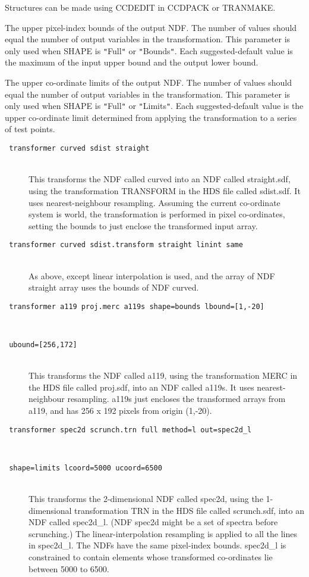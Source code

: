\documentclass[twoside,11pt]{article}
\newcommand{\htmlref}[2]{#1}
\newcommand{\sstexamples}[1]{
   \goodbreak
   \item[Examples:] \mbox{} \\
   \vspace{-3.5ex}
   \begin{description}
      #1
   \end{description}
}
\newcommand{\sstsubsection}[1]{ \item[{#1}] \mbox{} \\}
\newcommand{\sstexamplesubsection}[2]{\sloppy \item{\ssttt #1} \mbox{} \\ #2 }
\newcommand{\sstnotes}[1]{\pagebreak[3] \item[Notes:] \mbox{} \\[1.3ex] #1}
\newenvironment{sstitemize}{%
  \vspace{-4.3ex}\begin{itemize}}{\end{itemize}}
\newcommand{\sstitemlist}[1]{
  \mbox{} \\
  \vspace{-3.5ex}
  \begin{sstitemize}
     #1
  \end{sstitemize}
}
\newcommand{\ssttt}{\tt}
\renewcommand{\sstexamples}[1]{
      \htmlref{\item[Examples:]}{ap:example}
      \begin{description}
         #1
      \end{description}
   }
\renewcommand{\sstsubsection}[1]{\item[{#1}]}
\renewcommand{\sstexamplesubsection}[2]{\item[{\ssttt #1}] \\ #2}
\renewcommand{\sstnotes}[1]{\item[Notes:]
      \begin{description}
         #1
      \end{description}
   }
\newcommand{\sstitemlist}[1]{
      \begin{itemize}
         #1
      \end{itemize}
   }
\begin{document}
{{{         Structures can be made using CCDEDIT in CCDPACK or TRANMAKE.
      }
      \sstsubsection{
         UBOUND() = \_INTEGER (Read)
      }{
         The upper pixel-index bounds of the output NDF.  The number of
         values should equal the number of output variables in the
         transformation.  This parameter is only used when SHAPE is
         {\tt "}Full{\tt "} or {\tt "}Bounds{\tt "}.  Each suggested-default value is the
         maximum of the input upper bound and the output lower bound.
      }
      \sstsubsection{
         UCOORD() = \_DOUBLE (Read)
      }{
         The upper co-ordinate limits of the output NDF.  The number of
         values should equal the number of output variables in the
         transformation.  This parameter is only used when SHAPE is
         {\tt "}Full{\tt "} or {\tt "}Limits{\tt "}.  Each suggested-default value is the
         upper co-ordinate limit determined from applying the
         transformation to a series of test points.
      }
   }
   \sstexamples{
      \sstexamplesubsection{
         transformer curved sdist straight
      }{
         This transforms the NDF called curved into an NDF called
         straight.sdf, using the transformation TRANSFORM in the HDS
         file called sdist.sdf.  It uses nearest-neighbour resampling.
         Assuming the current co-ordinate system is world, the
         transformation is performed in pixel co-ordinates, setting the
         bounds to just enclose the transformed input array.
      }
      \sstexamplesubsection{
         transformer curved sdist.transform straight linint same
      }{
         As above, except linear interpolation is used, and the array
         of NDF straight array uses the bounds of NDF curved.
      }
      \sstexamplesubsection{
         transformer a119 proj.merc a119s shape=bounds lbound=[1,-20]
      }{
      }
      \sstexamplesubsection{
         ubound=[256,172]
      }{
         This transforms the NDF called a119, using the transformation
         MERC in the HDS file called proj.sdf, into an NDF called
         a119s.  It uses nearest-neighbour resampling.  a119s just
         encloses the transformed arrays from a119, and has 256 x 192
         pixels from origin (1,-20).
      }
      \sstexamplesubsection{
         transformer spec2d scrunch.trn full method=l out=spec2d\_l
      }{
      }
      \sstexamplesubsection{
         shape=limits lcoord=5000 ucoord=6500
      }{
         This transforms the 2-dimensional NDF called spec2d, using
         the 1-dimensional transformation TRN in the HDS file called
         scrunch.sdf, into an NDF called spec2d\_l.  (NDF spec2d might
         be a set of spectra before scrunching.)  The
         linear-interpolation resampling is applied to all the lines in
         spec2d\_l.  The NDFs have the same pixel-index bounds.
         spec2d\_l is constrained to contain elements whose transformed
         co-ordinates lie between 5000 to 6500.
      }
   }
   \sstnotes{
      \sstitemlist{

}}}
\end{document}

